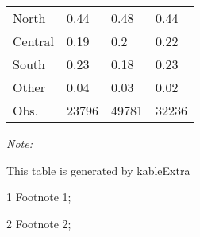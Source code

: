 \begin{table}
\begin{threeparttable}
\begin{tabular}[t]{llll}
\hspace{1em}North & 0.44 & 0.48 & 0.44\\
\hspace{1em}Central & 0.19 & 0.2 & 0.22\\
\hspace{1em}South & 0.23 & 0.18 & 0.23\\
\hspace{1em}Other & 0.04 & 0.03 & 0.02\\
Obs. & 23796 & 49781 & 32236\\
\bottomrule
\end{tabular}
\begin{tablenotes}
\item \textit{Note: } 
\item This table is generated by kableExtra
\item[1] Footnote 1; 
\item[2] Footnote 2; 
\end{tablenotes}
\end{threeparttable}
\end{table}
